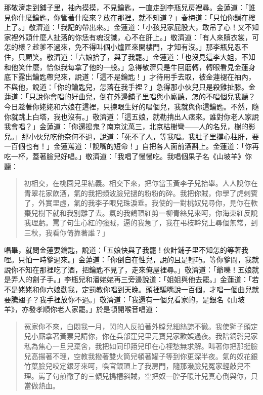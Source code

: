 那敬濟走到鋪子里，袖內摸摸，不見鑰匙，一直走到李瓶兒房裡尋。金蓮道：「誰見你什麼鑰匙，你管著什麼來？放在那裡，就不知道？」春梅道：「只怕你鎖在樓上了。」敬濟道：「我記的帶出來。」金蓮道：「小孩兒家屁股大，敢吊了心！又不知家裡外頭什麼人扯落的你恁有魂沒識，心不在肝上。」敬濟道：「有人來贖衣裳，可怎的樣？趁爹不過來，免不得叫個小爐匠來開樓門，才知有沒。」那李瓶兒忍不住，只顧笑。敬濟道：「六娘拾了，與了我罷。」金蓮道：「也沒見這李大姐，不知和他笑什麼，恰似我每拿了他的一般。」急得敬濟只是牛回磨轉，轉眼看見金蓮身底下露出鑰匙帶兒來，說道：「這不是鑰匙！」才待用手去取，被金蓮褪在袖內，不與他，說道：「你的鑰匙兒，怎落在我手裡？」急得那小伙兒只是殺雞扯膝。金蓮道：「只說你會唱的好曲兒，倒在外邊鋪子里唱與小廝聽，怎的不唱個兒我聽？今日趁著你姥姥和六娘在這裡，只揀眼生好的唱個兒，我就與你這鑰匙。不然，隨你就跳上白塔，我也沒有。」敬濟道：「這五娘，就勒掯出人痞來。誰對你老人家說我會唱？」金蓮道：「你還搗鬼？南京沈萬三，北京枯樹彎——人的名兒，樹的影兒。」那小伙兒吃他奈何不過，說道：「死不了人，等我唱。我肚子里撐心柱肝，要一百個也有！」金蓮罵道：「說嘴的短命！」自把各人面前酒斟上。金蓮道：「你再吃一杯，蓋著臉兒好唱。」敬濟道：「我唱了慢慢吃。我唱個果子名《山坡羊》你聽：
\begin{quote}
初相交，在桃園兒里結義。相交下來，把你當玉黃李子兒抬舉。人人說你在青翠花家飲酒，氣的我把頻波臉兒撾的粉粉的碎。我把你賊，你學了虎刺賓了，外實里虛，氣的我李子眼兒珠淚垂。我使的一對桃奴兒尋你，見你在軟棗兒樹下就和我別離了去。氣的我鶴頂紅剪一柳青絲兒來呵，你海東紅反說我理虧。罵了句生心紅的強賊，逼的我急了，我在弔枝幹兒上尋個無常，到三秋，我看你倚靠著誰？」
\end{quote}

唱畢，就問金蓮要鑰匙，說道：「五娘快與了我罷！伙計鋪子里不知怎的等著我哩。只怕一時爹過來。」金蓮道：「你倒自在性兒，說的且是輕巧。等你爹問，我就說你不知在那裡吃了酒，把鑰匙不見了，走來俺屋裡尋。」敬濟道：「爺嚛！五娘就是弄人的劊子手。」李瓶兒和潘姥姥再三旁邊說道：「姐姐與他去罷。」金蓮道：「若不是姥姥和你六娘勸我，定罰教你唱到天晚。頭裡騙嘴說一百個，才唱一個曲兒就要騰翅子？我手裡放你不過。」敬濟道：「我還有一個兒看家的，是銀名《山坡羊》，亦發孝順你老人家罷。」於是頓開喉音唱道：
\begin{quote}
冤家你不來，白悶我一月，閃的人反拍著外膛兒細絲諒不徹。我使獅子頭定兒小廝拿著黃票兒請你，你在兵部窪兒里元寶兒家歡娛過夜。我陪銅磬兒家私為焦心一旦兒棄舍，我把如同印箝兒印在心裡愁無求解。叫著你把那挺臉兒高揚著不理，空教我撥著雙火筒兒頓著罐子等到你更深半夜。氣的奴花銀竹葉臉兒咬定銀牙來呵，喚官銀頂上了我房門，隨那潑臉兒冤家輕敲兒不理。罵了句煎徹了的三傾兒搗槽斜賊，空把奴一腔子暖汁兒真心倒與你，只當做熱血。
\end{quote}


